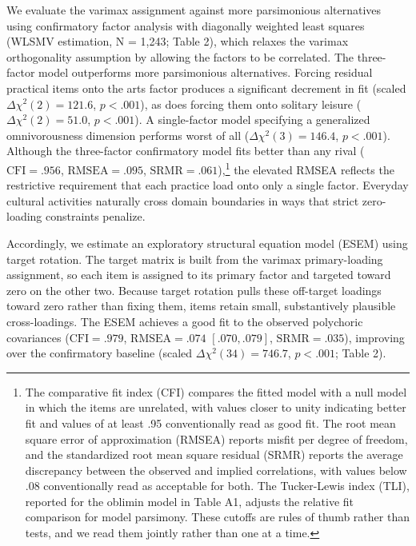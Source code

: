 \documentclass[
  12pt
]{article}
\begin{document}
We evaluate the varimax assignment against more parsimonious alternatives using confirmatory factor analysis with diagonally weighted least squares (WLSMV estimation, N = 1,243; Table 2), which relaxes the varimax orthogonality assumption by allowing the factors to be correlated. The three-factor model outperforms more parsimonious alternatives. Forcing residual practical items onto the arts factor produces a significant decrement in fit (scaled $\Delta\chi^2(2) = 121.6$, $p < .001$), as does forcing them onto solitary leisure ($\Delta\chi^2(2) = 51.0$, $p < .001$). A single-factor model specifying a generalized omnivorousness dimension performs worst of all ($\Delta\chi^2(3) = 146.4$, $p < .001$). Although the three-factor confirmatory model fits better than any rival ($\text{CFI} = .956$, $\text{RMSEA} = .095$, $\text{SRMR} = .061$),\footnote{The comparative fit index (CFI) compares the fitted model with a null model in which the items are unrelated, with values closer to unity indicating better fit and values of at least .95 conventionally read as good fit. The root mean square error of approximation (RMSEA) reports misfit per degree of freedom, and the standardized root mean square residual (SRMR) reports the average discrepancy between the observed and implied correlations, with values below .08 conventionally read as acceptable for both. The Tucker-Lewis index (TLI), reported for the oblimin model in Table A1, adjusts the relative fit comparison for model parsimony. These cutoffs are rules of thumb rather than tests, and we read them jointly rather than one at a time.} the elevated RMSEA reflects the restrictive requirement that each practice load onto only a single factor. Everyday cultural activities naturally cross domain boundaries in ways that strict zero-loading constraints penalize.

Accordingly, we estimate an exploratory structural equation model (ESEM) using target rotation. The target matrix is built from the varimax primary-loading assignment, so each item is assigned to its primary factor and targeted toward zero on the other two. Because target rotation pulls these off-target loadings toward zero rather than fixing them, items retain small, substantively plausible cross-loadings. The ESEM achieves a good fit to the observed polychoric covariances ($\text{CFI} = .979$, $\text{RMSEA} = .074$ $[.070, .079]$, $\text{SRMR} = .035$), improving over the confirmatory baseline (scaled $\Delta\chi^2(34) = 746.7$, $p < .001$; Table 2). 
\end{document}
